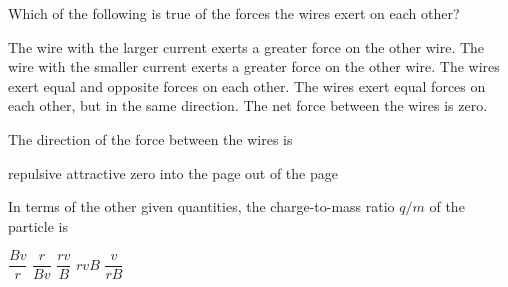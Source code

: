 \documentclass{../../oss-classkick-exam}
\begin{document}
\begin{multicols*}{2}
\begin{questions}

    \question Which of the following is true of the forces the wires exert on
    each other?
    \begin{choices}
      \choice The wire with the larger current exerts a greater force on the
      other wire.
      \choice The wire with the smaller current exerts a greater force on the
      other wire.
      \choice The wires exert equal and opposite forces on each other.
      \choice The wires exert equal forces on each other, but in the same
      direction.
      \choice The net force between the wires is zero.
    \end{choices}
    \label{q:2curr1}
    \vspace{.7in}
    
    \question The direction of the force between the wires is
    \begin{choices}
      \choice repulsive
      \choice attractive
      \choice zero
      \choice into the page
      \choice out of the page
    \end{choices}
    \label{q:2curr2}
    \vspace{.7in}
    

    \question In terms of the other given quantities, the charge-to-mass ratio
    $q/m$ of the particle is
    \begin{choices}
      \choice $\dfrac{Bv}r$
      \choice $\dfrac r{Bv}$
      \choice $\dfrac{rv}B$
      \choice $rvB$
      \choice $\dfrac v{rB}$
    \end{choices}
    \label{q:circ1}
    

\end{questions}
\end{multicols*}
\end{document}
